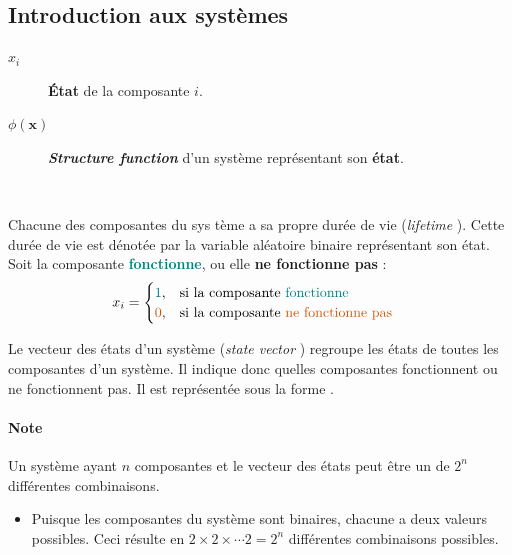 \documentclass[10pt, french]{article}
\begin{document}
\begin{multicols*}{2}
\subsection{Introduction aux systèmes}
\begin{distributions}[Notation]
\begin{description}
	\item[$x_{i}$]	\textbf{État} de la composante $i$.
	\item[$\phi(\bm{x})$]	\og \textit{\textbf{Structure function}} \fg{} d'un système représentant son \textbf{état}.
\end{description}
\end{distributions}

\

\begin{definitionNOHFILLsub}
Chacune des composantes du sys tème a sa propre durée de vie (\og \textit{lifetime} \fg{}). Cette durée de vie est dénotée par la variable aléatoire binaire  représentant son état.\\

Soit la composante \textbf{\textcolor{teal}{fonctionne}}, ou elle \textbf{\textcolor{burntorange}{ne fonctionne pas}} :
\begin{align*}
	x_{i}
	&=	\begin{cases}
		\textcolor{teal}{1},	&	\text{si la composante \textcolor{teal}{fonctionne}}	\\
		\textcolor{burntorange}{0},	&	\text{si la composante \textcolor{burntorange}{ne fonctionne pas}}	
		\end{cases}
\end{align*}
\end{definitionNOHFILLsub}

\begin{definitionNOHFILLsub}
Le vecteur des états d'un système (\og \textit{state vector} \fg{}) regroupe les états de toutes les composantes d'un système. Il indique donc quelles composantes fonctionnent ou ne fonctionnent pas. Il est représentée sous la forme .\\

\paragraph{Note}	Un système ayant $n$ composantes et le vecteur des états peut être un de $2^{n}$ différentes combinaisons.
\begin{itemize}
	\item	Puisque les composantes du système sont binaires, chacune a deux valeurs possibles. Ceci résulte en $2 \times 2 \times \cdots 2 = 2^{n}$ différentes combinaisons possibles.
\end{itemize}
\end{definitionNOHFILLsub}


\end{multicols*}
\end{document}
